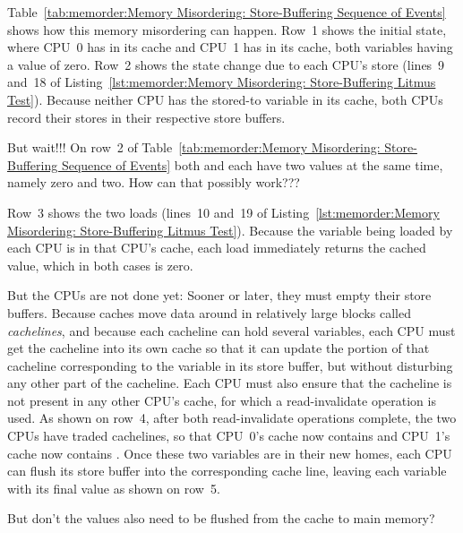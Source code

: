 Table~\ref{tab:memorder:Memory Misordering: Store-Buffering Sequence of Events}
shows how this memory misordering can happen.
Row~1 shows the initial state, where CPU~0 has  in its cache
and CPU~1 has  in its cache, both variables having a value of zero.
Row~2 shows the state change due to each CPU's store (lines~9 and~18 of
Listing~\ref{lst:memorder:Memory Misordering: Store-Buffering Litmus Test}).
Because neither CPU has the stored-to variable in its cache, both CPUs
record their stores in their respective store buffers.

\QuickQuiz{}
	But wait!!!
	On row~2 of
	Table~\ref{tab:memorder:Memory Misordering: Store-Buffering Sequence of Events}
	both  and  each have two values at the same time,
	namely zero and two.
	How can that possibly work???
 \QuickQuizEnd

Row~3 shows the two loads (lines~10 and~19 of
Listing~\ref{lst:memorder:Memory Misordering: Store-Buffering Litmus Test}).
Because the variable being loaded by each CPU is in that CPU's cache,
each load immediately returns the cached value, which in both cases
is zero.

But the CPUs are not done yet: Sooner or later, they must empty their
store buffers.
Because caches move data around in relatively large blocks called
\emph{cachelines}, and because each cacheline can hold several
variables, each CPU must get the cacheline into its own cache so
that it can update the portion of that cacheline corresponding
to the variable in its store buffer, but without disturbing any
other part of the cacheline.
Each CPU must also ensure that the cacheline is not present in any other
CPU's cache, for which a read-invalidate operation is used.
As shown on row~4, after both read-invalidate operations complete,
the two CPUs have traded cachelines, so that CPU~0's cache now contains
 and CPU~1's cache now contains .
Once these two variables are in their new homes, each CPU can flush
its store buffer into the corresponding cache line, leaving each
variable with its final value as shown on row~5.

\QuickQuiz{}
	But don't the values also need to be flushed from the cache
	to main memory?
 \QuickQuizEnd


